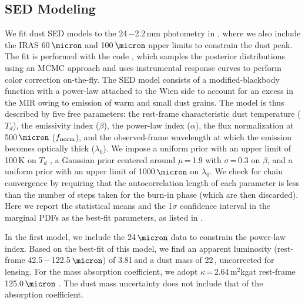 \documentclass[]{emulateapj}
\begin{document}
\subsection{SED Modeling} \label{sec:SED}  %
We fit dust SED models to the
24\,\micron$-$2.2\,mm photometry in , where we also
include the IRAS 60\,$\micron$ and 100\,$\micron$ upper limits
to constrain the dust peak.
The fit is performed with the code
 \citep[\eg][]{Riechers13a,Dowell14a}, which samples the posterior
distributions using an MCMC approach and uses instrumental
response curves to perform color correction on-the-fly.
The SED model consists of a modified-blackbody
function with a power-law attached to the
Wien side to account for an excess in the MIR owing to emission of
warm and small dust grains.
%
The model is thus described by five free parameters: the rest-frame characteristic dust
temperature ($T_{d}$), the emissivity index ($\beta$), the power-law index
($\alpha$), the flux normalization at 500\,$\micron$ ($f_{\rm norm}$), and
the observed-frame wavelength at which the emission
becomes optically thick ($\lambda_{0}$). We impose
a uniform prior with an upper limit of 100\,K on $T_d$ \citep[see \eg][]{Sajina12a},
a Gaussian prior centered around
$\mu$\,=\,1.9 with $\sigma$\,=\,0.3 on $\beta$, and a uniform prior with an upper limit of
1000\,$\micron$ on $\lambda_0$.
We check for chain convergence by requiring that the autocorrelation
length of each parameter is less than the number of steps
taken for the burn-in phase (which are then discarded).
Here we report the statistical means %
and the 1$\sigma$ confidence interval in the marginal PDFs
as the best-fit parameters, as listed in .


In the first model, we include the 24\,$\micron$ data
to constrain the power-law index. Based on the
best-fit of this model, we find an apparent
\fir luminosity (rest-frame 42.5\,$-$\,122.5\,$\micron$) of
3.81\,\Lsun and a
dust mass of 22\,\Msun, uncorrected for lensing.
For the mass absorption coefficient, we adopt
$\kappa$\,=\,2.64\,m$^2$kg\pmOne at rest-frame 125.0\,$\micron$
\citep{Dunne03a}.
The dust mass uncertainty does not
include that of the absorption coefficient.
\end{document}

